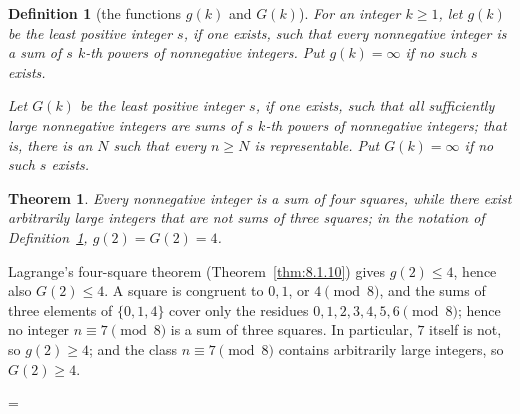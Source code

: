 \documentclass[11pt]{article}
\makeatletter
\theoremstyle{ntstyle}
\newtheorem{theorem}{Theorem}[subsection]
\newtheorem{definition}{Definition}[subsection]
\let\nt@closedisplay\]
\def\nt@guardedclose{\@ifnextchar\par{\nt@closeafterpar}{\@ifnextchar\end{\postdisplaypenalty\@M\nt@closedisplay}{\nt@closedisplay}}}
\def\nt@closeafterpar\par{\@ifnextchar\par{\nt@closeafterpar}{\@ifnextchar\end{\postdisplaypenalty\@M\nt@closedisplay\par}{\nt@closedisplay\par}}}
\renewenvironment{proof}[1][\proofname]{\par
  \pushQED{\qed}\normalfont\topsep\medskipamount\edef\nt@afterproof{\@endparpenalty=\the\@endparpenalty\relax}\@beginparpenalty\@M\@endparpenalty\@M\let\]\nt@guardedclose\trivlist\item[]\textit{#1\@addpunct{.}} \ignorespaces}{\ifvmode\addpenalty\@M\fi\popQED\nt@afterproof\endtrivlist\@endpefalse}
\makeatother
\begin{document}
\begin{definition}[the functions $g(k)$ and $G(k)$]
	\label{def:12.6.1} For an integer $k\ge1$,
	let $g(k)$ be the least positive integer $s$, if one exists, such that
	every nonnegative integer is a sum of $s$ $k$-th powers of
	nonnegative integers. Put $g(k)=\infty$ if no such $s$ exists.

	Let $G(k)$ be the least positive integer $s$, if one exists, such that
	all sufficiently large nonnegative integers are sums of $s$ $k$-th
	powers of nonnegative integers; that is, there is an $N$ such that every
	$n\ge N$ is representable. Put $G(k)=\infty$ if no such $s$ exists.

\end{definition}
\begin{theorem}\label{thm:12.6.1} Every nonnegative integer is a
	sum of four squares, while there exist arbitrarily large integers
	that are not sums of three squares; in the notation of Definition~\ref{def:12.6.1}, $g(2)
		= G(2) = 4$.

\end{theorem}

\begin{proof} Lagrange's four-square theorem (Theorem~\ref{thm:8.1.10}) gives $g(2)\le4$, hence also $G(2)\le4$. A square
	is congruent to $0, 1$, or $4\pmod{8}$, and the sums of three
	elements of $\{0, 1, 4\}$ cover only the residues $0, 1, 2, 3, 4, 5,
		6\pmod{8}$; hence no integer $n\equiv7\pmod{8}$ is a sum of three
	squares. In particular, $7$ itself is not, so $g(2)\ge4$; and the
	class $n\equiv7\pmod{8}$ contains arbitrarily large integers, so
	$G(2)\ge4$.

\end{proof}
\end{document}
